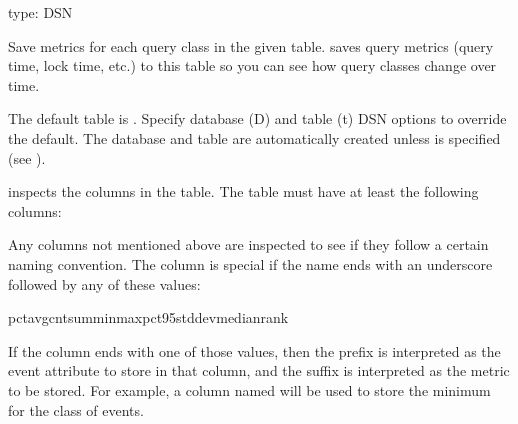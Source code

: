 \documentclass[letterpaper,10pt,english]{sphinxmanual}
\begin{document}
\begin{fulllineitems}
\label{\detokenize{mariadb-query-digest:cmdoption-mariadb-query-digest-history}}
type: DSN

Save metrics for each query class in the given table.   saves
query metrics (query time, lock time, etc.) to this table so you can see how
query classes change over time.

The default table is .  Specify database
(D) and table (t) DSN options to override the default.  The database and
table are automatically created unless 
is specified (see ).

 inspects the columns in the table.  The table must have at
least the following columns:

\begin{sphinxVerbatim}[commandchars=\\\{\}]
   
         
           
\end{sphinxVerbatim}

Any columns not mentioned above are inspected to see if they follow a certain
naming convention.  The column is special if the name ends with an underscore
followed by any of these values:

\begin{sphinxVerbatim}[commandchars=\\\{\}]
pctavgcntsumminmaxpct\PYGZus{}95stddevmedianrank
\end{sphinxVerbatim}

If the column ends with one of those values, then the prefix is interpreted as
the event attribute to store in that column, and the suffix is interpreted as
the metric to be stored.  For example, a column named  will be
used to store the minimum  for the class of events.


\end{fulllineitems}
\end{document}
